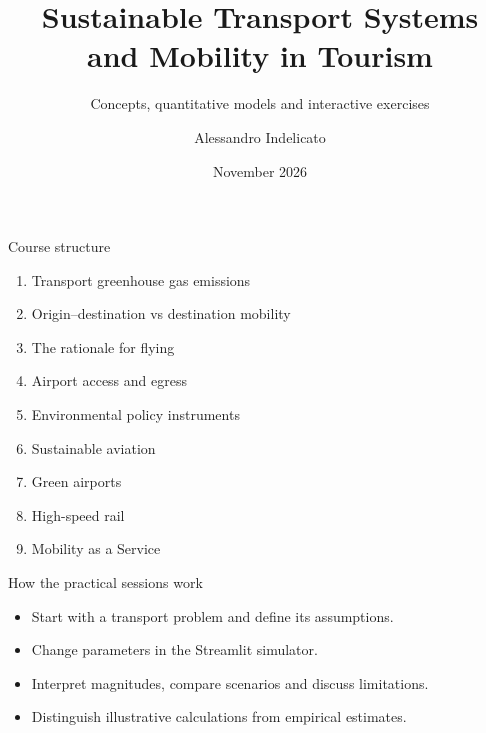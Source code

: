 \documentclass[aspectratio=169,11pt]{beamer}
\title[Sustainable Transport and Tourism]{Sustainable Transport Systems\\and Mobility in Tourism}
\subtitle{Concepts, quantitative models and interactive exercises}
\author{Alessandro Indelicato}
\date{November 2026}
\begin{document}
\begin{frame}[plain]\titlepage\end{frame}
\begin{frame}{Course structure}\begin{enumerate}\item Transport greenhouse gas emissions\item Origin--destination vs destination mobility\item The rationale for flying\item Airport access and egress\item Environmental policy instruments\item Sustainable aviation\item Green airports\item High-speed rail\item Mobility as a Service\end{enumerate}\end{frame}
\begin{frame}{How the practical sessions work}\begin{itemize}\item Start with a transport problem and define its assumptions.\item Change parameters in the Streamlit simulator.\item Interpret magnitudes, compare scenarios and discuss limitations.\item Distinguish illustrative calculations from empirical estimates.\end{itemize}\end{frame}
\end{document}

